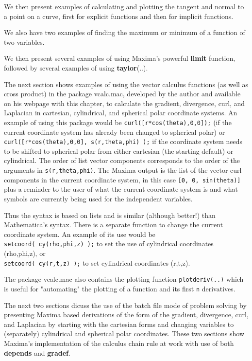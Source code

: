 \documentclass[12pt]{article}
\begin{document}
\smallskip
We then present examples of calculating and plotting the tangent and normal to a
  point on a curve, first for explicit functions and then for implicit functions.  

\smallskip
We also have two examples of finding the maximum or minimum of a function of two 
  variables.  

\smallskip
We then present several examples of using Maxima's powerful \textbf{limit} function,
 followed by several examples of using \textbf{taylor}(..).

\smallskip
The next section shows examples of using the vector calculus functions (as well as
  cross product) in the package vcalc.mac, developed by the author and available on
  his webpage with this chapter, to calculate the gradient, divergence, curl,
  and Laplacian in cartesian, cylindrical, and spherical polar coordinate systems.
An example of using this package would be \verb|curl([r*cos(theta),0,0]);| (if the
  current coordinate system has already been changed to spherical polar) or
  \verb|curl([r*cos(theta),0,0], s(r,theta,phi) );| if the coordinate system needs
  to be shifted to spherical polar from either cartesian (the starting default) or
  cylindrical.
The order of list vector components corresponds to the order of the arguments 
  in \verb|s(r,theta,phi)|.  
The Maxima output is the list of the vector curl components in the current coordinate system,
  in this case \verb|[0, 0, sin(theta)]| plus a reminder to the user of what the current
   coordinate system is and what symbols are currently being used for the independent 
   variables.

\smallskip
Thus the syntax is based on lists and is similar (although better!) than Mathematica's
  syntax.
There is a separate function to change the current coordinate system.
An example of its use would be\\
 \verb|setcoord( cy(rho,phi,z) );| to set the use
  of cylindrical coordinates (rho,phi,z), or\\
  \verb|setcoord( cy(r,t,z) );| to set
  cylindrical coordinates (r,t,z).

\smallskip
The package vcalc.mac also contains the plotting function \verb|plotderiv(..)| which
  is useful for "automating" the plotting of a function and its first \verb|n| derivatives.


\smallskip
The next two sections dicuss the use of the batch file  mode of problem solving
  by presenting Maxima based derivations of the form of the gradient, divergence,
   curl, and Laplacian by starting with the cartesian forms and changing 
   variables to (separately)  cylindrical and spherical polar coordinates.
   These two sections show Maxima's implementation of the calculus chain rule at work
   with use of both \textbf{depends} and \textbf{gradef}.
   
\end{document}
